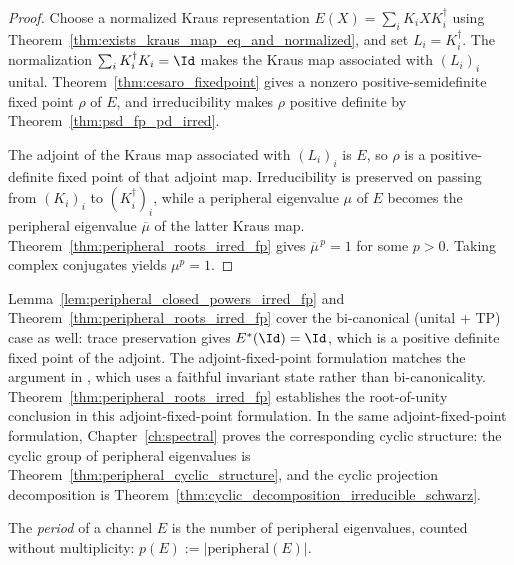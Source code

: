 \begin{proof}\leanok
    Choose a normalized Kraus representation
    $E(X)=\sum_iK_iXK_i^\dagger$ using
    Theorem~\ref{thm:exists_kraus_map_eq_and_normalized}, and set
    $L_i=K_i^\dagger$. The normalization
    $\sum_iK_i^\dagger K_i=\Id$ makes the Kraus map associated with $(L_i)_i$
    unital. Theorem~\ref{thm:cesaro_fixedpoint} gives a nonzero
    positive-semidefinite fixed point $\rho$ of $E$, and irreducibility makes
    $\rho$ positive definite by Theorem~\ref{thm:psd_fp_pd_irred}.

    The adjoint of the Kraus map associated with $(L_i)_i$ is $E$, so $\rho$
    is a positive-definite fixed point of that adjoint map. Irreducibility is
    preserved on passing from $(K_i)_i$ to $(K_i^\dagger)_i$, while a peripheral
    eigenvalue $\mu$ of $E$ becomes the peripheral eigenvalue $\overline\mu$ of
    the latter Kraus map. Theorem~\ref{thm:peripheral_roots_irred_fp} gives
    $\overline\mu^{\,p}=1$ for some $p>0$. Taking complex conjugates yields
    $\mu^p=1$.
\end{proof}

\begin{remark}\label{rem:adjoint_fp_more_general}\leanok
    Lemma~\ref{lem:peripheral_closed_powers_irred_fp}
    and Theorem~\ref{thm:peripheral_roots_irred_fp}
    cover the bi-canonical (unital + TP) case as well:
    trace preservation gives
    $E^*(\Id)=\Id$, which is a positive definite fixed
    point of the adjoint.
    The adjoint-fixed-point formulation matches the
    argument in \cite[Appendix~A]{Cirac2016MPDO_arXiv},
    which uses a faithful invariant state rather than
    bi-canonicality.
    Theorem~\ref{thm:peripheral_roots_irred_fp} establishes the
    root-of-unity conclusion in this adjoint-fixed-point formulation.
    In the same adjoint-fixed-point formulation, Chapter~\ref{ch:spectral}
    proves the corresponding cyclic structure: the cyclic group of
    peripheral eigenvalues is Theorem~\ref{thm:peripheral_cyclic_structure},
    and the cyclic projection decomposition is
    Theorem~\ref{thm:cyclic_decomposition_irreducible_schwarz}.
\end{remark}

\begin{definition}\label{def:channel_period}
    \leanok
    The \emph{period} of a channel $E$ is the number of
    peripheral eigenvalues, counted without multiplicity:
    $p(E):=|\mathrm{peripheral}(E)|$.
\end{definition}

